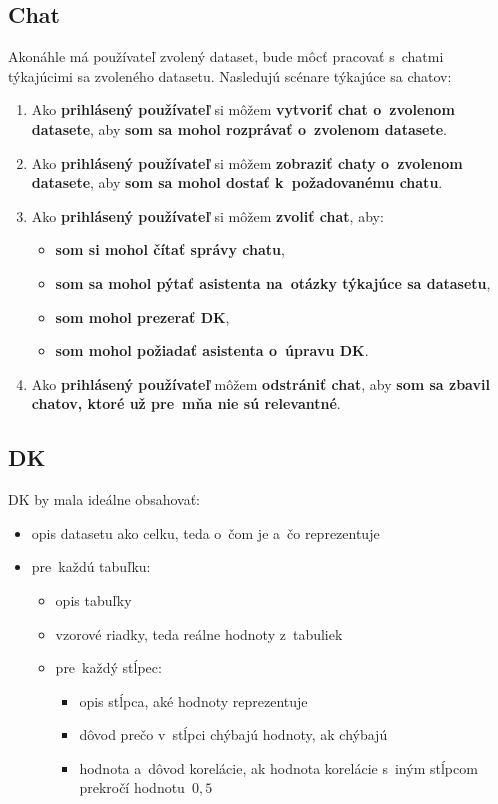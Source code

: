 \subsection{Chat}
\label{chat}

Akonáhle má používateľ zvolený dataset, bude môcť pracovať s~chatmi týkajúcimi sa zvoleného datasetu. Nasledujú scénare týkajúce sa chatov:
\begin{enumerate}
\item Ako \textbf{prihlásený používateľ} si môžem \textbf{vytvoriť chat o~zvolenom datasete}, aby \textbf{som sa mohol rozprávať o~zvolenom datasete}.

\item Ako \textbf{prihlásený používateľ} si môžem \textbf{zobraziť chaty o~zvolenom datasete}, aby \textbf{som sa mohol dostať k~požadovanému chatu}.

\item Ako \textbf{prihlásený používateľ} si môžem \textbf{zvoliť chat}, aby:
\begin{itemize}
\item \textbf{som si mohol čítať správy chatu},
\item \textbf{som sa mohol pýtať asistenta na~otázky týkajúce sa datasetu},
\item \textbf{som mohol prezerať DK},
\item \textbf{som mohol požiadať asistenta o~úpravu DK}.
\end{itemize}

\item Ako \textbf{prihlásený používateľ} môžem \textbf{odstrániť chat}, aby \textbf{som sa zbavil chatov, ktoré už pre~mňa nie sú relevantné}.
\end{enumerate}

\subsection{DK}
\label{dk}

DK by mala ideálne obsahovať:
\begin{itemize}
\item opis datasetu ako celku, teda o~čom je a~čo reprezentuje

\item pre~každú tabuľku:
\begin{itemize}
\item opis tabuľky
\item vzorové riadky, teda reálne hodnoty z~tabuliek
\item pre~každý stĺpec:
\begin{itemize}

\item opis stĺpca, aké hodnoty reprezentuje

\item dôvod prečo v~stĺpci chýbajú hodnoty, ak chýbajú

\item hodnota a~dôvod korelácie, ak hodnota korelácie s~iným stĺpcom prekročí hodnotu~$0,5$
\end{itemize}
\end{itemize}
\end{itemize}

